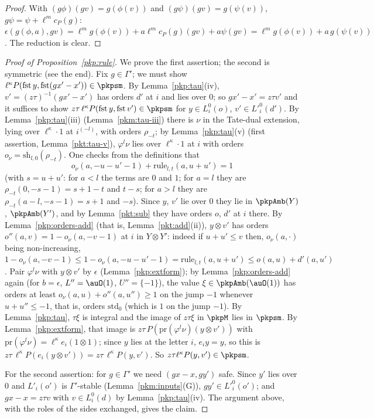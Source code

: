 \documentclass[10pt]{amsart}
\theoremstyle{definition}
\theoremstyle{remark}
\begin{document}
\begin{proof}
With $(g\phi)(gv)=g(\phi(v))$ and $(g\psi)(gv)=g(\psi(v))$, $g\psi=\psi+\ell^mc_P(g)$:
$\epsilon(g(\phi,a),gv)=\ell^mg(\phi(v))+a\ell^mc_P(g)(gv)+a\psi(gv)=\ell^mg(\phi(v))+a\,g(\psi(v))$.
The reduction is clear.
\end{proof}

\begin{proof}[Proof of Proposition~\ref{pkp:rule}]
We prove the first assertion; the second is symmetric (see the end). Fix $g\in\Gamma'$; we must show
$\ell^\kappa P(\mathrm{fst}\,y,\mathrm{fst}(gx'-x'))\in\pkpsm$. By Lemma~\ref{pkp:tau}(iv),
$v'=(z\tau)^{-1}(gx'-x')$ has orders $d'$ at $i$ and lies over $0$; so $gx'-x'=z\tau v'$ and it
suffices to show $z\tau\,\ell^\kappa P(\mathrm{fst}\,y,\mathrm{fst}\,v')\in\pkpsm$ for $y\in L^0_i(o)$,
$v'\in L'^0_i(d')$. By Lemma~\ref{pkp:tau}(iii) (Lemma~\ref{pkm:tau-iii}) there is $\nu$ in the Tate-dual extension, lying
over $\ell^\kappa\cdot1$ at $i^{(-l)}$, with orders $\rho_{-t}$; by Lemma~\ref{pkp:tau}(v) (first
assertion, Lemma~\ref{pkt:tau-v}), $\varphi^l\nu$ lies
over $\ell^\kappa\cdot1$ at $i$ with orders $o_\nu=\mathrm{sh}_{l,0}(\rho_{-t})$. One checks from the
definitions that
\begin{equation}\label{pkp:eq-ruleid}
o_\nu(a,-u-u'-1)+\mathrm{rule}_{l,t}(a,u+u')=1
\end{equation}
(with $s=u+u'$: for $a<l$ the terms are $0$ and $1$; for $a=l$ they are $\rho_{-t}(0,-s-1)=s+1-t$ and
$t-s$; for $a>l$ they are $\rho_{-t}(a-l,-s-1)=s+1$ and $-s$). Since $y$, $v'$ lie over $0$ they lie in $\pkpAmb(Y)$,
$\pkpAmb(Y')$, and by Lemma~\ref{pkt:sub} they have orders $o$, $d'$ at $i$ there. By Lemma~\ref{pkp:orders-add} (that is, Lemma~\ref{pkt:add}(ii)), $y\otimes v'$ has orders $o''(a,v)=1-o_\nu(a,-v-1)$ at
$i$ in $Y\otimes Y'$: indeed if $u+u'\le v$ then, $o_\nu(a,\cdot)$ being non-increasing,
$1-o_\nu(a,-v-1)\le1-o_\nu(a,-u-u'-1)=\mathrm{rule}_{l,t}(a,u+u')\le o(a,u)+d'(a,u')$. Pair
$\varphi^l\nu$ with $y\otimes v'$ by $\epsilon$ (Lemma~\ref{pkp:extform}); by
Lemma~\ref{pkp:orders-add} again (for $b=\epsilon$, $L''=\auO(1)$, $U''=\{-1\}$), the value $\xi\in\pkpAmb(\auO(1))$ has orders at least
$o_\nu(a,u)+o''(a,u'')\ge1$ on the jump $-1$ whenever $u+u''\le-1$, that is, orders
$\mathrm{std}_0$ (which is $1$ on the jump $-1$). By Lemma~\ref{pkp:tau}, $\tau\xi$ is integral and the
image of $z\tau\xi$ in $\pkpM$ lies in $\pkpsm$. By Lemma~\ref{pkp:extform}, that image is
$z\tau\,P(\mathrm{pr}(\varphi^l\nu)(y\otimes v'))$ with $\mathrm{pr}(\varphi^l\nu)=\ell^\kappa e_i(1\otimes
1)$; since $y$ lies at the letter $i$, $e_iy=y$, so this is $z\tau\,\ell^\kappa P(e_i(y\otimes v'))=z\tau\,\ell^\kappa P(y,v')$. So $z\tau\ell^\kappa P(y,v')\in\pkpsm$.

For the second assertion: for $g\in\Gamma'$ we need $(gx-x,gy')$ safe. Since $y'$ lies over $0$ and
$L'_i(o')$ is $\Gamma'$-stable (Lemma~\ref{pkm:inputs}(G)), $gy'\in L'^0_i(o')$; and $gx-x=z\tau v$ with $v\in
L^0_i(d)$ by Lemma~\ref{pkp:tau}(iv). The argument above, with the roles of the sides exchanged,
gives the claim.
\end{proof}
\end{document}
